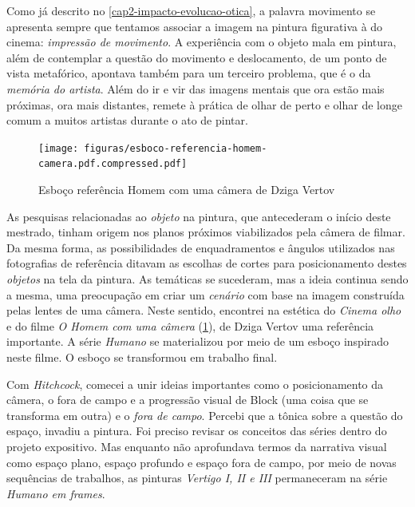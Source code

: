 Como já descrito no \cref{cap2-impacto-evolucao-otica}, a palavra
movimento se apresenta sempre que tentamos associar a imagem na pintura
figurativa à do cinema: \emph{impressão de movimento}. A experiência
com o objeto mala em pintura, além de contemplar a questão do movimento
e deslocamento, de um ponto de vista metafórico, apontava também para
um terceiro problema, que é o da \emph{memória do artista}. Além do ir
e vir das imagens mentais que ora estão mais próximas, ora mais
distantes, remete à prática de olhar de perto e olhar de longe comum a
muitos artistas durante o ato de pintar.

\begin{figure}
  \caption{Esboço referência Homem com uma câmera de Dziga Vertov}\label{esboco-dziga-vertov}

\texttt{[image: figuras/esboco-referencia-homem-camera.pdf.compressed.pdf]}
\end{figure}

As pesquisas relacionadas ao \emph{objeto} na pintura, que antecederam
o início deste mestrado, tinham origem nos planos próximos viabilizados
pela câmera de filmar. Da mesma forma, as possibilidades de
enquadramentos e ângulos utilizados nas fotografias de referência
ditavam as escolhas de cortes para posicionamento destes \emph{objetos}
na tela da pintura. As temáticas se sucederam, mas a ideia continua
sendo a mesma, uma preocupação em criar um \emph{cenário} com base na
imagem construída pelas lentes de uma câmera. Neste sentido, encontrei
na estética do \emph{Cinema olho} e do filme \emph{O Homem com uma
câmera} (\cref{esboco-dziga-vertov}), de Dziga Vertov uma referência importante. A série
\emph{Humano} se materializou por meio de um esboço inspirado neste
filme. O esboço se transformou em trabalho final.


Com \emph{Hitchcock}, comecei a unir ideias importantes como o
posicionamento da câmera, o fora de campo e a progressão visual de
Block (uma coisa que se transforma em outra) e o \emph{fora de campo}.
Percebi que a tônica sobre a questão do espaço, invadiu a pintura. Foi
preciso revisar os conceitos das séries dentro do projeto expositivo.
Mas enquanto não aprofundava termos da narrativa visual como espaço
plano, espaço profundo e espaço fora de campo, por meio de novas
sequências de trabalhos, as pinturas \emph{Vertigo I, II e III}
permaneceram na série \emph{Humano em frames}.

